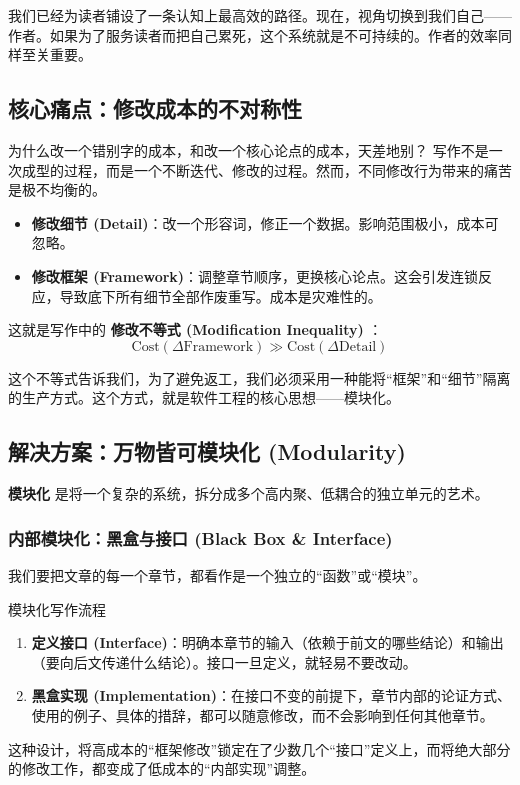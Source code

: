\documentclass[11pt, a4paper]{ctexart}
\newcommand{\lowfreq}[1]{%
	{\Large\bfseries\color{red!60!black} #1}%
}
\begin{document}
	我们已经为读者铺设了一条认知上最高效的路径。现在，视角切换到我们自己——作者。如果为了服务读者而把自己累死，这个系统就是不可持续的。作者的效率同样至关重要。
	
	\subsection{核心痛点：修改成本的不对称性}
	
	\begin{thinkbox}{为什么改一个错别字的成本，和改一个核心论点的成本，天差地别？}
		写作不是一次成型的过程，而是一个不断迭代、修改的过程。然而，不同修改行为带来的痛苦是极不均衡的。
		\begin{itemize}
			\item \textbf{修改细节 (Detail)}：改一个形容词，修正一个数据。影响范围极小，成本可忽略。
			\item \textbf{修改框架 (Framework)}：调整章节顺序，更换核心论点。这会引发连锁反应，导致底下所有细节全部作废重写。成本是灾难性的。
		\end{itemize}
		
		这就是写作中的\lowfreq{修改不等式 (Modification Inequality)}：
		$$ \text{Cost}(\Delta \text{Framework}) \gg \text{Cost}(\Delta \text{Detail}) $$
	\end{thinkbox}
	
	这个不等式告诉我们，为了避免返工，我们必须采用一种能将“框架”和“细节”隔离的生产方式。这个方式，就是软件工程的核心思想——模块化。
	
	\subsection{解决方案：万物皆可模块化 (Modularity)}
	
	\lowfreq{模块化}是将一个复杂的系统，拆分成多个高内聚、低耦合的独立单元的艺术。
	
	\subsubsection{内部模块化：黑盒与接口 (Black Box \& Interface)}
	
	我们要把文章的每一个章节，都看作是一个独立的“函数”或“模块”。
	
	\begin{strategybox}{模块化写作流程}
		\begin{enumerate}
			\item \textbf{定义接口 (Interface)}：明确本章节的输入（依赖于前文的哪些结论）和输出（要向后文传递什么结论）。接口一旦定义，就轻易不要改动。
			\item \textbf{黑盒实现 (Implementation)}：在接口不变的前提下，章节内部的论证方式、使用的例子、具体的措辞，都可以随意修改，而不会影响到任何其他章节。
		\end{enumerate}
		这种设计，将高成本的“框架修改”锁定在了少数几个“接口”定义上，而将绝大部分的修改工作，都变成了低成本的“内部实现”调整。
	\end{strategybox}
	
\end{document}
